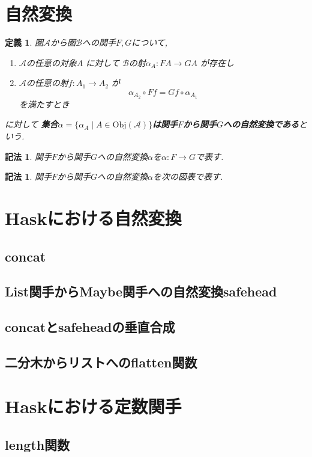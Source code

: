 \documentclass[dvipdfmx]{jsbook}
\theoremstyle{plain}
\newtheorem{Def}[thm]{定義}
\newtheorem{Notation}[thm]{記法}
\begin{document}
\section{自然変換}
\begin{Def}
圏$\mathscr{A}$から圏$\mathscr{B}$への関手$F,G$について,
\begin{enumerate}
\item $\mathscr{A}$の任意の対象$A$ 
に対して
$\mathscr{B}$の射$\alpha_A:FA\rightarrow GA$
が存在し
\item $\mathscr{A}$の任意の射$f:A_1\rightarrow A_2$
が
\[
\alpha_{A_2}\circ Ff
=Gf\circ\alpha_{A_1}
\]
を満たすとき
\end{enumerate}に対して
{\bf 集合$\alpha=\{\alpha_A\mid A\in\mathrm{Obj}(\mathscr{A})\}$は関手$F$から関手$G$への自然変換である}という.
\end{Def}
\begin{Notation}
関手$F$から関手$G$への自然変換$\alpha$を$\alpha:F\rightarrow G$で表す.
\end{Notation}
\begin{Notation}
関手$F$から関手$G$への自然変換$\alpha$を次の図表で表す.
\end{Notation}
\section{Haskにおける自然変換}
\subsection{concat}
\subsection{List関手からMaybe関手への自然変換safehead}
\subsection{concatとsafeheadの垂直合成}
\subsection{二分木からリストへのflatten関数}

\section{Haskにおける定数関手}
\subsection{length関数}
\end{document}
